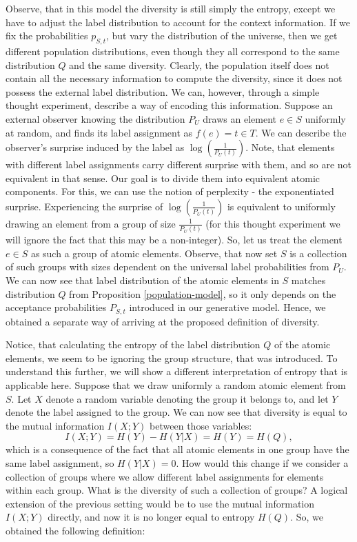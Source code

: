 \documentclass{article} %
\begin{document}
Observe, that in this model the diversity is still simply the entropy,
except we have to adjust the label distribution to account for the
context information. If we fix the probabilities $p_{S,t}$, but vary
the distribution of the universe, then we get different population
distributions, even though they all correspond to the same
distribution $Q$ and the same diversity. Clearly, the population itself
does not contain all the necessary information to compute the
diversity, since it does not possess the external label
distribution. We can, however, through a simple thought experiment,
describe a way of encoding this information. Suppose an external
observer knowing the distribution $P_U$ draws an
element $e\in S$ uniformly at random, and finds its label
assignment as $f(e)=t\in T$. We can describe the observer's surprise
induced by the label as $\log(\frac{1}{P_U(t)})$. Note, that elements
with different label assignments carry different surprise
with them, and so are not equivalent in that sense. Our goal is to
divide them into equivalent atomic components. For this, we can use the
notion of perplexity - the exponentiated surprise. Experiencing
the surprise  of $\log(\frac{1}{P_U(t)})$ is equivalent to uniformly
drawing an element from a group of size $\frac{1}{P_U(t)}$ (for this
thought experiment we will ignore the fact that this may be a
non-integer). So, let us treat the element $e\in S$ as such a group of
atomic elements. Observe, that now set $S$ is a collection of such
groups with sizes dependent on the universal label probabilities from
$P_U$. We can now see that label distribution of the atomic elements
in $S$ matches distribution $Q$ from Proposition
\ref{population-model}, so it only depends on the acceptance
probabilities $P_{S,t}$ introduced in our generative model. Hence, we
obtained a separate way of arriving at the proposed definition of
diversity. 

Notice, that calculating the entropy of the label
distribution $Q$ of the atomic elements, we seem to be ignoring the
group structure, that was introduced. To understand this further, we
will show a different interpretation of entropy that is applicable
here. Suppose that we draw uniformly a random atomic element from
$S$. Let $X$ denote a random variable denoting the group it belongs
to, and let $Y$ denote the label assigned to the group. We can now
see that diversity is equal to the mutual information $I(X;Y)$ between
those variables: 
\[I(X;Y)=H(Y)-H(Y|X) = H(Y)=H(Q),\]
which is a consequence of the fact that all atomic elements in one
group have the same label assignment, so $H(Y|X)=0$. How would this change if we consider a collection of
groups where we allow different label assignments for elements within
each group. What is the diversity of such a collection of groups? A
logical extension of the previous setting would be to use the mutual
information $I(X;Y)$ directly, and now it is no longer equal to entropy
$H(Q)$. So, we obtained the following definition:
\end{document}
